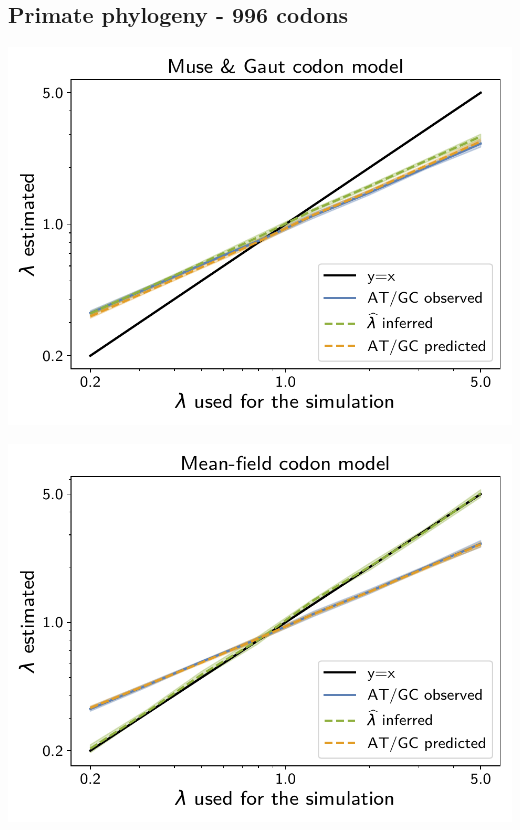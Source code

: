 \documentclass{article}
\begin{document}
\subsection{Primate phylogeny - 996 codons}

\begin{center}
    \begin{minipage}{0.325\linewidth}
        \includegraphics[width=\linewidth, page=1]{inference_supp_mat/PrimatesExons2Mu1.0_lambda_MG.pdf}
    \end{minipage}
    \hfill
    \begin{minipage}{0.325\linewidth}
        \includegraphics[width=\linewidth, page=1]{inference_supp_mat/PrimatesExons2Mu1.0_lambda_MF.pdf}

\end{minipage}
\end{center}
\end{document}

